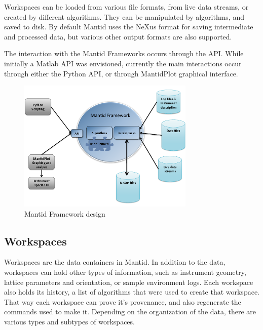 \documentclass{elsarticle}
\begin{document}
Workspaces can be loaded from various file formats, from live data streams, or created by different algorithms. They can be manipulated by algorithms, and saved to disk. By default Mantid uses the NeXus format for saving intermediate and processed data, but various other output formats are also supported.

The interaction with the Mantid Frameworks occurs through the API. While initially a Matlab API was envisioned, currently the main interactions occur through either the Python API, or through MantidPlot graphical interface. 
\label{components}
\begin{figure}[!ht]
\centerline{\includegraphics[width=0.75\textwidth]{MantidFramework.png}}
\caption{Mantid Framework design}
\label{fig:Framework}
\end{figure}

\subsection{Workspaces}
Workspaces are the data containers in Mantid. In addition to the data, workspaces can hold other types of information, such as instrument geometry, lattice parameters and orientation, or sample environment logs. Each workspace also holds its history, a list of algorithms that were used to create that workspace. That way each workspace can prove it's provenance, and also regenerate the commands used to make it. Depending on the organization of the data, there are various types and subtypes of workspaces.
\end{document}
